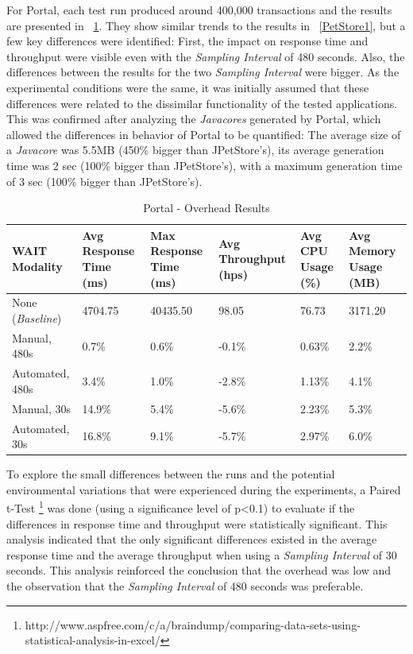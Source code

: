 \documentclass[runningheads,a4paper]{llncs}
\begin{document}
For Portal, each test run produced around 400,000 transactions and the
results are presented in \tablename ~\ref{Portal1}. They show similar trends
to the results in \tablename ~\ref{PetStore1}, but a few
key differences were identified: First, the impact on response time and
throughput were visible even with the \emph{Sampling Interval} of 480 seconds.
Also, the differences between the results for the two \emph{Sampling Interval}
were bigger. As the experimental conditions were the same, it was initially
assumed that these differences were related to the dissimilar functionality of the 
tested applications. This was confirmed after analyzing the \emph{Javacores} generated 
by Portal, which allowed the differences in behavior of Portal to be quantified:
The average size of a \emph{Javacore} was 5.5MB (450\% bigger than JPetStore's), its 
average generation time was 2 sec (100\% bigger than JPetStore's), with a maximum 
generation time of 3 sec (100\% bigger than JPetStore's).

\vspace{-5pt}
\begin{table}[!h]
\caption{Portal - Overhead Results}
\label{Portal1}
\centering
\begin{tabular}{p{}|p{}|p{}|p{}|p{}|p{}}
\hline
\bfseries WAIT Modality & \bfseries Avg Response Time (ms)& \bfseries Max
Response Time (ms)& \bfseries Avg Throughput (hps)& \bfseries Avg CPU Usage
(\%) & \bfseries Avg Memory Usage (MB)\\
\hline
None (\emph{Baseline}) 	& 4704.75	& 40435.50	& 98.05 	& 76.73 	& 3171.20\\
Manual, 480s 			& 0.7\% 	& 0.6\%		& -0.1\%	& 0.63\% 	& 2.2\%\\
Automated, 480s 		& 3.4\%		& 1.0\%		& -2.8\% 	& 1.13\% 	& 4.1\%\\
Manual, 30s 			& 14.9\%	& 5.4\%		& -5.6\% 	& 2.23\% 	& 5.3\%\\
Automated, 30s 			& 16.8\%	& 9.1\%		& -5.7\% 	& 2.97\% 	& 6.0\%\\
\hline
\end{tabular}
\end{table}
\vspace{-5pt}


To explore the small differences between the runs and the potential
environmental variations that were experienced during the experiments, a Paired
t-Test
\footnote{http://www.aspfree.com/c/a/braindump/comparing-data-sets-using-statistical-analysis-in-excel/}
was done (using a significance level of p\textless0.1) to evaluate if the
differences in response time and throughput were statistically significant. 
This analysis indicated that 
the only significant differences existed in the average response time and the
average throughput when using a \emph{Sampling Interval} of 30 seconds. 
This analysis reinforced the conclusion that the overhead was low and the
observation that the \emph{Sampling Interval} of 480 seconds was preferable.
\end{document}
